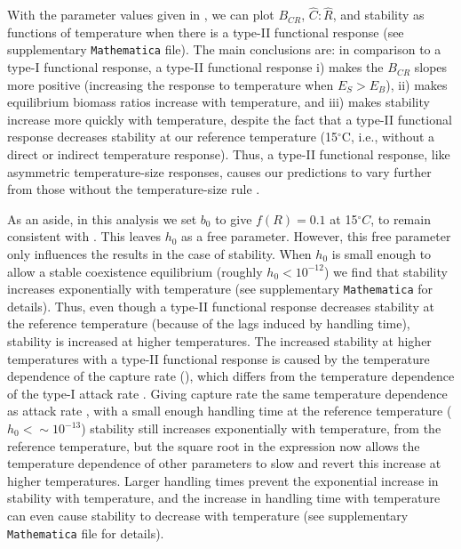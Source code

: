 \documentclass[11pt]{article}
\begin{document}
With the parameter values given in \cite{Rall2012}, we can plot $B_{CR}$, $\hat{C}:\hat{R}$, and stability as functions of temperature when there is a type-II functional response (see supplementary \texttt{Mathematica} file).
The main conclusions are: in comparison to a type-I functional response, a type-II functional response i) makes the $B_{CR}$ slopes more positive (increasing the response to temperature when $E_S > E_B$), ii) makes equilibrium biomass ratios increase with temperature, and iii) makes stability increase more quickly with temperature, despite the fact that a type-II functional response decreases stability at our reference temperature (15$^\circ$C, i.e., without a direct or indirect temperature response).
Thus, a type-II functional response, like asymmetric temperature-size responses, causes our predictions to vary further from those without the temperature-size rule \citep{Gilbert2014}.
%
%

As an aside, in this analysis we set $b_0$ to give $f(R) = 0.1$ at 15$^\circ C$, to remain consistent with \cite{Gilbert2014}.
This leaves $h_0$ as a free parameter. 
However, this free parameter only influences the results in the case of stability.
When $h_0$ is small enough to allow a stable coexistence equilibrium (roughly $h_0 <10^{-12}$) we find that stability increases exponentially with temperature (see supplementary \texttt{Mathematica} for details).
Thus, even though a type-II functional response decreases stability at the reference temperature (because of the lags induced by handling time), stability is increased at higher temperatures. 
The increased stability at higher temperatures with a type-II functional response is caused by the temperature dependence of the capture rate (\cite{Rall2012}), which differs from the temperature dependence of the type-I attack rate \citep{Gilbert2014}.
Giving capture rate the same temperature dependence as attack rate \citep{Gilbert2014}, with a small enough handling time at the reference temperature ($h_0 <\sim10^{-13}$) stability still increases exponentially with temperature, from the reference temperature, but the square root in the expression now allows the temperature dependence of other parameters to slow and revert this increase at higher temperatures.
Larger handling times prevent the exponential increase in stability with temperature, and the increase in handling time with temperature can even cause stability to decrease with temperature (see supplementary \texttt{Mathematica} file for details). 
\end{document}

